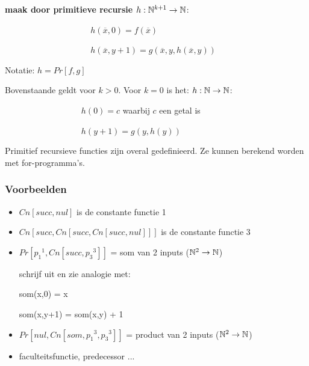 {\bf maak door primitieve recursie $h: \mathbb{N}^{k+1}  \rightarrow \mathbb{N}$}:

$~~~~~~~~~~~~~~~~~~~~~~~~~~~~~~~~~~~~~~~~~~~~~~h(\overline{x},0) = f(\overline{x})$ 

$~~~~~~~~~~~~~~~~~~~~~~~~~~~~~~~~~~~~~~~~~~~~~~h(\overline{x},y+1) = g(\overline{x},y,h(\overline{x},y))$

Notatie: $h = Pr[f,g]$

Bovenstaande geldt voor $k>0$. Voor $k=0$ is het: $h: \mathbb{N} \rightarrow \mathbb{N}$:

$~~~~~~~~~~~~~~~~~~~~~~~~~~~~~~~~~~~~~~~~~h(0) = c$  waarbij $c$ een getal is

$~~~~~~~~~~~~~~~~~~~~~~~~~~~~~~~~~~~~~~~~~h(y+1) = g(y,h(y))$




Primitief recursieve functies zijn overal gedefinieerd. Ze kunnen
berekend worden met for-programma's.



\subsubsection{Voorbeelden}

\begin{itemize}
\item 
$Cn[succ,nul]$ is de constante functie 1

\item 
$Cn[succ,Cn[succ,Cn[succ,nul]]]$ is de constante functie 3

\item 
$Pr[{p_1}^1,Cn[succ,{p_3}^3]]$ = som van 2 inputs ($\mathbb{N}^2 \rightarrow \mathbb{N}$)

schrijf uit en zie analogie met:

som(x,0) = x

som(x,y+1) = som(x,y) + 1


\item 

$Pr[nul,Cn[som,{p_1}^3, {p_3}^3]]$ = product van 2 inputs ($\mathbb{N}^2 \rightarrow \mathbb{N}$)

\item 
faculteitsfunctie, predecessor ...

\end{itemize}





